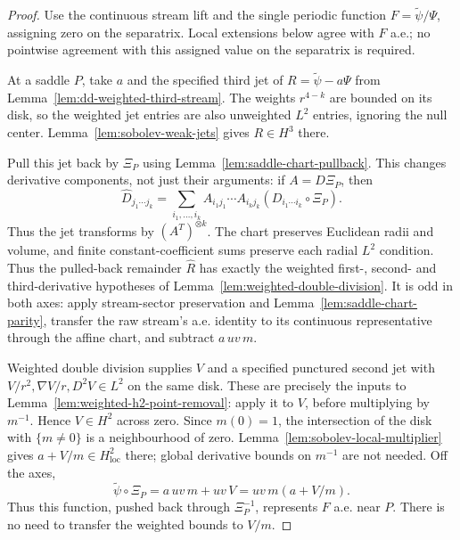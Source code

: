 \begin{proof}
\leanok
Use the continuous stream lift and the single periodic function
$F=\widetilde\psi/\Psi$, assigning zero on the separatrix.
Local extensions below agree with $F$ a.e.; no pointwise agreement with
this assigned value on the separatrix is required.

At a saddle $P$, take $a$ and the specified third jet of
$R=\widetilde\psi-a\Psi$ from
Lemma~\ref{lem:dd-weighted-third-stream}.
The weights $r^{4-k}$ are bounded on its disk, so the weighted jet
entries are also unweighted $L^2$ entries, ignoring the null center.
Lemma~\ref{lem:sobolev-weak-jets} gives $R\in H^3$ there.

Pull this jet back by $\Xi_P$ using
Lemma~\ref{lem:saddle-chart-pullback}. This changes derivative components,
not just their arguments: if $A=D\Xi_P$, then
\[
 \widehat D_{j_1\cdots j_k}
 =\sum_{i_1,\ldots,i_k}A_{i_1j_1}\cdots A_{i_kj_k}
       (D_{i_1\cdots i_k}\circ\Xi_P).
\]
Thus the jet transforms by $(A^T)^{\otimes k}$. The chart preserves
Euclidean radii and volume, and finite constant-coefficient sums preserve
each radial $L^2$ condition. Thus the pulled-back remainder $\widehat R$ has exactly
the weighted first-, second- and third-derivative hypotheses of
Lemma~\ref{lem:weighted-double-division}.
It is odd in both axes: apply stream-sector preservation and
Lemma~\ref{lem:saddle-chart-parity}, transfer the raw stream's a.e.
identity to its continuous representative through the affine chart,
and subtract $a\,uv\,m$.

Weighted double division supplies $V$ and a specified punctured second jet
with $V/r^2,\nabla V/r,D^2V\in L^2$ on the same disk.
These are precisely the inputs to
Lemma~\ref{lem:weighted-h2-point-removal}: apply it to $V$, before
multiplying by $m^{-1}$. Hence $V\in H^2$ across zero.
Since $m(0)=1$, the intersection of the disk with $\{m\ne0\}$ is a
neighbourhood of zero. Lemma~\ref{lem:sobolev-local-multiplier} gives
$a+V/m\in H^2_{\mathrm{loc}}$ there; global derivative bounds on $m^{-1}$
are not needed.
Off the axes,
\[
 \widetilde\psi\circ\Xi_P
   =a\,uv\,m+uv\,V=uv\,m(a+V/m).
\]
Thus this function, pushed back through $\Xi_P^{-1}$, represents $F$
a.e. near $P$. There is no need to transfer the weighted bounds to $V/m$.


\end{proof}
